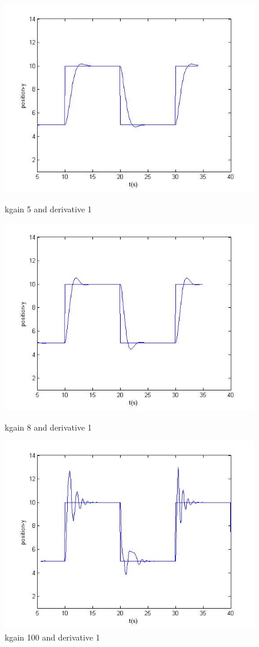 \begin{figure}[!htb]
\captionsetup{justification=centering}
  \includegraphics[width=\linewidth]{fig/gain5d1.jpg}
  \caption{kgain 5 and derivative 1}
\endminipage\hfill
{}
  \includegraphics[width=\linewidth]{fig/gain8d1.jpg}
  \caption{kgain 8 and derivative 1}
\endminipage\hfill
{}%
  \includegraphics[width=\linewidth]{fig/gain100d1.jpg}
  \caption{kgain 100 and derivative 1}
\endminipage
\end{figure}

